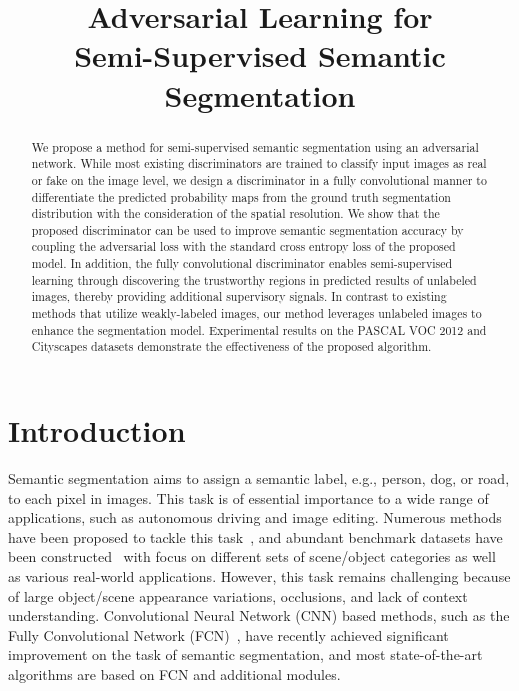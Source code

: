 \documentclass{bmvc2k}
\title{Adversarial Learning for \\
	Semi-Supervised Semantic Segmentation}
\begin{document}
	
	\maketitle
	
	\begin{abstract}
		
		We propose a method for semi-supervised semantic segmentation using an adversarial network.
		While most existing discriminators are trained to classify input images as real or fake on the image level, we design a discriminator in a fully convolutional manner to differentiate the predicted probability maps from the ground truth segmentation distribution with the consideration of the spatial resolution.
		We show that the proposed discriminator can be used to improve semantic segmentation accuracy by coupling the adversarial loss with the standard cross entropy loss of the proposed model. 
		In addition, the fully convolutional discriminator enables semi-supervised learning through discovering the trustworthy regions in predicted results of unlabeled images, thereby providing additional supervisory signals.
		In contrast to existing methods that utilize weakly-labeled images, our method leverages unlabeled images to enhance the segmentation model.
		Experimental results on the PASCAL VOC 2012 and Cityscapes datasets demonstrate the effectiveness of the proposed algorithm.
	
	\end{abstract}
	
	\section{Introduction}
	
	
	
	Semantic segmentation aims to assign a semantic label, e.g., person, dog, or road, to each pixel in images.
	This task is of essential importance to a wide range of applications, such as autonomous driving and image editing.
	Numerous methods have been proposed to tackle this task~\cite{fcn,crfasrnn,deepparsing,dilated,piecewise,hung2017scene}, and abundant benchmark datasets have been constructed~\cite{pascal, pascal_context, cityscapes, zhou2016semantic}
	with focus on different sets of scene/object categories as well as various real-world applications.
	However, this task remains challenging because of large object/scene appearance variations, occlusions, and lack of context understanding.
	Convolutional Neural Network (CNN) based methods, such as the Fully Convolutional Network (FCN)~\cite{fcn}, have recently achieved significant improvement on the task of semantic segmentation, and most state-of-the-art algorithms are based on FCN and additional modules.
	
\end{document}
